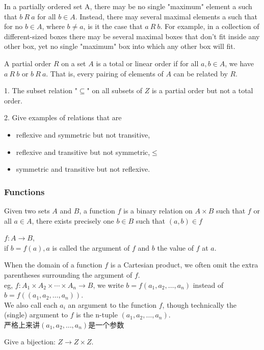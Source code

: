 \documentclass{article}
\begin{document}
In a partially ordered set A, there may be no single "maximum" element a such that $b\ R\ a$ for all $b \in A$. Instead, there may several maximal elements a such that for no $b \in A$, where $b \neq a$, is it the case that $a\ R\ b$. For example, in a collection of different-sized boxes there may be several maximal boxes that don't fit inside any other box, yet no single "maximum" box into which any other box will fit.

A partial order $R$ on a set $A$ is a total or linear order if for all $a, b \in A$, we have $a\ R\ b$ or $b\ R\ a$. That is, every pairing of elements of $A$ can be related by $R$.

1. The subset relation "$\subseteq$" on all subsets of $Z$ is a partial order but not a total order.

2. Give examples of relations that are
\begin{itemize}
	\item reflexive and symmetric but not transitive,
	\item reflexive and transitive but not symmetric,$\leq$
	\item symmetric and transitive but not reflexive.
\end{itemize}

\subsubsection{Functions}
Given two sets $A$ and $B$, a function $f$ is a binary relation on $A \times B$ such that $f$ or all $a \in A$,
there exists precisely one $b \in B$ such that $(a, b) \in f$

$f : A \rightarrow B$, \\
if $b = f(a), a$ is called the argument of $f$ and $b$ the value of $f$ at $a$.

When the domain of a function $f$ is a Cartesian product, we often omit the extra parentheses surrounding the argument of $f$.\\
eg, $f : A_1 \times A_2 \times \cdots \times A_n \rightarrow B$, we write $b = f(a_1,a_2,\ldots,a_n)$ instead of $b = f((a_1,a_2,\ldots,a_n))$. \\
We also call each $a_i$ an argument to the function $f$, though technically the (single) argument to $f$ is the n-tuple $(a_1,a_2,\ldots,a_n)$.\\
严格上来讲$(a_1,a_2,\ldots,a_n)$是一个参数

Give a bijection: $Z \rightarrow Z \times Z$.
\end{document}
